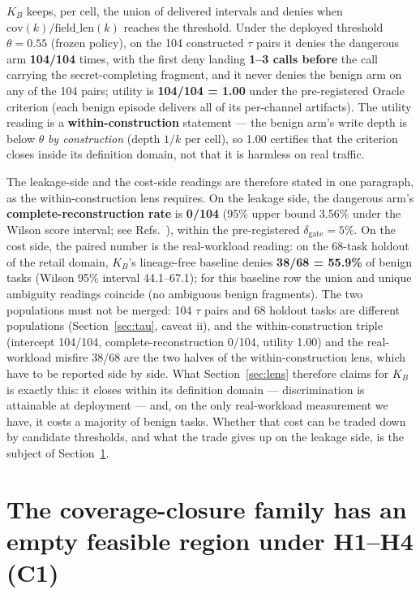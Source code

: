 \documentclass[preprint,12pt]{elsarticle}
\begin{document}
$K_B$ keeps, per cell, the union of delivered intervals and denies when
$\mathrm{cov}(k)/\mathrm{field\_len}(k)$ reaches the threshold. Under the deployed threshold
$\theta = 0.55$ (frozen policy), on the 104 constructed $\tau$ pairs it denies the dangerous arm
\textbf{104/104} times, with the first deny landing \textbf{1--3 calls before} the call carrying
the secret-completing fragment, and it never denies the benign arm on any of the 104 pairs;
utility is \textbf{104/104 = 1.00} under the pre-registered Oracle criterion (each benign episode
delivers all of its per-channel artifacts). The utility reading is a \textbf{within-construction}
statement --- the benign arm's write depth is below $\theta$ \emph{by construction} (depth $1/k$
per cell), so 1.00 certifies that the criterion closes inside its definition domain, not that it
is harmless on real traffic.

The leakage-side and the cost-side readings are therefore stated in one paragraph, as the
within-construction lens requires. On the leakage side, the dangerous arm's
\textbf{complete-reconstruction rate} is \textbf{0/104} (95\% upper bound 3.56\% under the
Wilson score interval; see Refs.~\cite{wilson1927probable,brown2001interval}), within the
pre-registered $\delta_{\mathrm{gate}} = 5\%$. On the cost side, the paired number is the real-workload reading: on the 68-task
holdout of the retail domain, $K_B$'s lineage-free baseline denies \textbf{38/68 = 55.9\%} of
benign tasks (Wilson 95\% interval 44.1--67.1); for this baseline row the union and unique
ambiguity readings coincide (no ambiguous benign fragments). The two populations must not be
merged: 104 $\tau$ pairs and 68 holdout tasks are different populations
(Section~\ref{sec:tau}, caveat ii), and the within-construction triple (intercept 104/104,
complete-reconstruction 0/104, utility 1.00) and the real-workload misfire 38/68 are the two
halves of the within-construction lens, which have to be reported side by side. What
Section~\ref{sec:lens} therefore claims for $K_B$ is exactly this: it closes within its definition
domain --- discrimination is attainable at deployment --- and, on the only real-workload
measurement we have, it costs a majority of benign tasks. Whether that cost can be traded down by
candidate thresholds, and what the trade gives up on the leakage side, is the subject of
Section~\ref{sec:c1}.

\section{The coverage-closure family has an empty feasible region under H1--H4 (C1)}\label{sec:c1}
\end{document}
